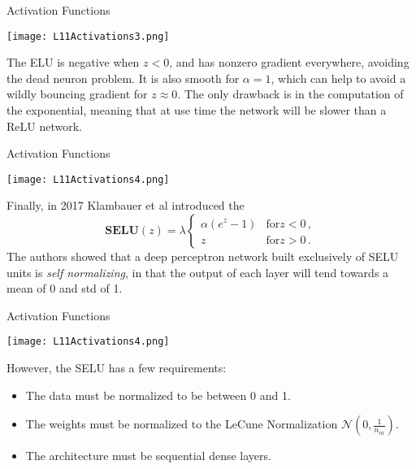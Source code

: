 \documentclass[10pt, table, dvipsnames,xcdraw,handout]{beamer}
\begin{document}
\begin{frame}[fragile]{Activation Functions}
  \begin{minipage}[t][0.5\textheight][t]{\textwidth}
	\centering \texttt{[image: L11Activations3.png]} 
  \end{minipage}
  \vfill
\begin{minipage}[t][0.5\textheight][t]{\textwidth}
The ELU is negative when $z<0$, and has nonzero gradient everywhere, avoiding the dead neuron problem. It is also smooth for $\alpha=1$, which can help to avoid a wildly bouncing gradient for $z\approx 0$. The only drawback is in the computation of the exponential, meaning that at use time the network will be slower than a ReLU network.
\end{minipage}
\end{frame}






\begin{frame}[fragile]{Activation Functions}
  \begin{minipage}[t][0.5\textheight][t]{\textwidth}
	\centering \texttt{[image: L11Activations4.png]} 
  \end{minipage}
  \vfill
\begin{minipage}[t][0.5\textheight][t]{\textwidth}
Finally, in 2017 Klambauer et al introduced the 
$$
\textbf{SELU}(z) = \lambda\begin{cases}
\alpha (e^z - 1)&\text{for} z<0\,,
\\
z&\text{for} z>0\,.
\end{cases}
$$
The authors showed that a deep perceptron network built exclusively of SELU units is \emph{self normalizing}, in that the output of each layer will tend towards a mean of 0 and std of 1. 
\end{minipage}
\end{frame}



\begin{frame}[fragile]{Activation Functions}
  \begin{minipage}[t][0.5\textheight][t]{\textwidth}
	\centering \texttt{[image: L11Activations4.png]} 
  \end{minipage}
  \vfill
\begin{minipage}[t][0.5\textheight][t]{\textwidth}
However, the SELU has a few requirements:

\begin{itemize}
\item The data must be normalized to be between 0 and 1.
\item The weights must be normalized to the LeCune Normalization $\mathcal{N}(0,\frac{1}{n_{in}})$.
\item The architecture must be sequential dense layers. 
\end{itemize}
\end{minipage}
\end{frame}
\end{document}
